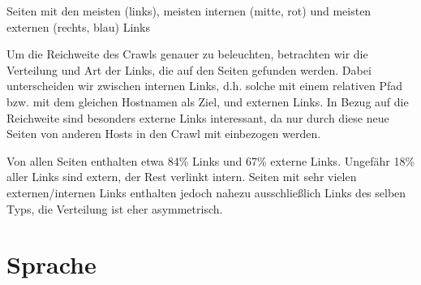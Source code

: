 \documentclass[a4paper,12pt,titlepage=false]{scrreprt}
\begin{document}
\centerline{Seiten mit den meisten (links), meisten internen (mitte, rot) und meisten externen (rechts, blau) Links}
\vspace{-.2cm}

Um die Reichweite des Crawls genauer zu beleuchten, betrachten wir die Verteilung und Art der Links, die auf den Seiten gefunden werden. Dabei unterscheiden wir zwischen internen Links, d.h. solche mit einem relativen Pfad bzw. mit dem gleichen Hostnamen als Ziel, und externen Links. In Bezug auf die Reichweite sind besonders externe Links interessant, da nur durch diese neue Seiten von anderen Hosts in den Crawl mit einbezogen werden.

Von allen Seiten enthalten etwa 84\% Links und 67\% externe Links. Ungefähr 18\% aller Links sind extern, der Rest verlinkt intern. Seiten mit sehr vielen externen/internen Links enthalten jedoch nahezu ausschließlich Links des selben Typs, die Verteilung ist eher asymmetrisch.

\section{Sprache}
\end{document}
